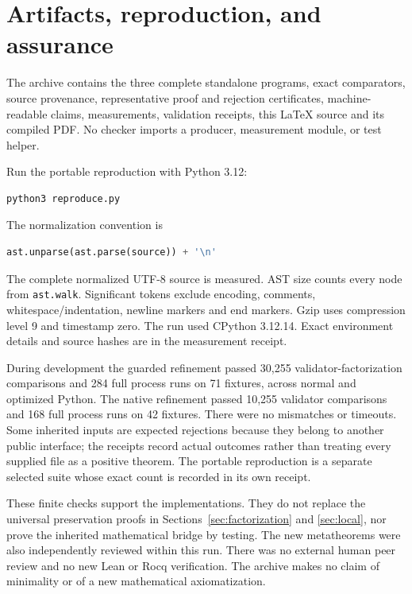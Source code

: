 \documentclass[11pt,letterpaper]{article}
\theoremstyle{definition}\newtheorem{definition}[theorem]{Definition}
\theoremstyle{remark}\newtheorem{remark}[theorem]{Remark}
\begin{document}
\section{Artifacts, reproduction, and assurance}
\label{sec:reproduction}

The archive contains the three complete standalone programs, exact
comparators, source provenance, representative proof and rejection
certificates, machine-readable claims, measurements, validation receipts,
this LaTeX source and its compiled PDF. No checker imports a producer,
measurement module, or test helper.

Run the portable reproduction with Python 3.12:
\begin{lstlisting}
python3 reproduce.py
\end{lstlisting}
The normalization convention is
\begin{lstlisting}[language=Python]
ast.unparse(ast.parse(source)) + '\n'
\end{lstlisting}
The complete normalized UTF-8 source is measured. AST size counts every
node from \texttt{ast.walk}. Significant tokens exclude encoding,
comments, whitespace/indentation, newline markers and end markers.
Gzip uses compression level 9 and timestamp zero. The run used CPython
3.12.14. Exact environment details and source hashes are in the
measurement receipt.

During development the guarded refinement passed 30,255
validator-factorization comparisons and 284 full process runs on 71
fixtures, across normal and optimized Python. The native refinement
passed 10,255 validator comparisons and 168 full process runs on 42
fixtures. There were no mismatches or timeouts. Some inherited inputs
are expected rejections because they belong to another public interface;
the receipts record actual outcomes rather than treating every supplied
file as a positive theorem. The portable reproduction is a separate
selected suite whose exact count is recorded in its own receipt.

These finite checks support the implementations. They do not replace the
universal preservation proofs in Sections~\ref{sec:factorization} and
\ref{sec:local}, nor prove the inherited mathematical bridge by testing.
The new metatheorems were also independently reviewed within this run.
There was no external human peer review and no new Lean or Rocq
verification. The archive makes no claim of minimality or of a new
mathematical axiomatization.

\clearpage
\appendix
\end{document}
